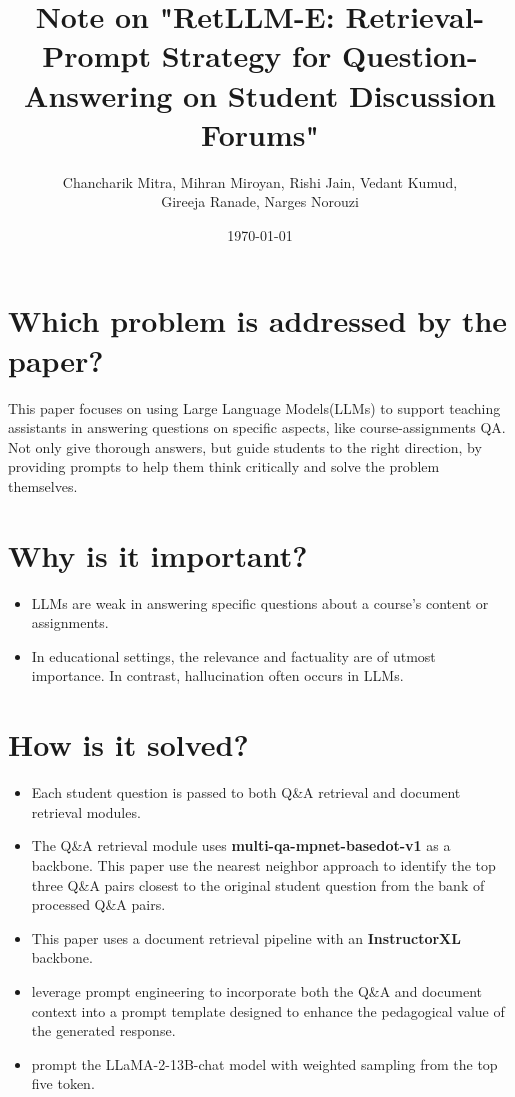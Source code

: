 \documentclass{article}
\title{Note on "RetLLM-E: Retrieval-Prompt Strategy for Question-Answering on Student Discussion Forums"}
\author{Chancharik Mitra, Mihran Miroyan, Rishi Jain, Vedant Kumud,\\ Gireeja Ranade, Narges Norouzi}
\date{\today}
\begin{document}
\maketitle

\section{Which problem is addressed by the paper?}

This paper focuses on using Large Language Models(LLMs) to support teaching assistants in answering questions on specific aspects, like course-assignments QA. 
Not only give thorough answers, but guide students to the right direction, by providing prompts to help them think critically and solve the problem themselves.

\section{Why is it important?}

\begin{itemize}
    \item LLMs are weak in answering specific questions about a course's content or assignments.
    \item In educational settings, the relevance and factuality are of utmost importance. In contrast, hallucination often occurs in LLMs.
\end{itemize}

\section{How is it solved?}

\begin{itemize}
    \item Each student question is passed to both Q\&A retrieval and document retrieval modules.
    \item The Q\&A retrieval module uses \textbf{multi-qa-mpnet-basedot-v1} as a backbone. This paper use the nearest neighbor approach to identify the top three Q\&A pairs closest to the original student question from the bank of processed Q\&A pairs.
    \item This paper uses a document retrieval pipeline with an \textbf{InstructorXL} backbone.
    \item leverage prompt engineering to incorporate both the Q\&A and document context into a prompt template designed to enhance the pedagogical value of the generated response.
    \item prompt the LLaMA-2-13B-chat model with weighted sampling from the top five token.
\end{itemize}
\end{document}
